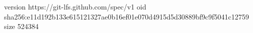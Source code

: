 version https://git-lfs.github.com/spec/v1
oid sha256:e11d192b133e615121327ae0b16ef01e070d4915d5d30889bf9c9f5041c12759
size 524384
